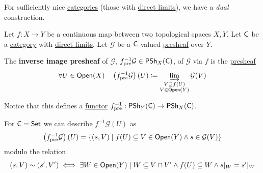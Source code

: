 \documentclass[../../../main]{subfiles}
\begin{document}
For sufficiently nice \hyperref[def:category]{categories} (those with \hyperref[def:direct-limit]{direct limits}), we have a \textit{dual} construction.
\begin{definition} \label{def:inverse-image-presheaf}
  Let \(f: X \to Y\) be a continuous map between two topological spaces \(X, Y\).
  Let \(\mathsf{C}\) be a \hyperref[def:category]{category} with \hyperref[def:direct-limit]{direct limits}.
  Let \(\mathcal{G}\) be a \(\mathsf{C}\)-valued \hyperref[def:presheaf]{presheaf} over \(Y\).

  The \textbf{inverse image presheaf} of \(\mathcal{G}\), \(f_{\operatorname{pre}}^{-1}\mathcal{G} \in \mathsf{PSh}_{X}(\mathsf{C})\), of \(\mathcal{G}\) via \(f\) is the \hyperref[def:presheaf]{presheaf}
  \begin{equation*}
    \forall U \in \mathsf{Open}(X) \quad \left( f_{\operatorname{pre}}^{-1}\mathcal{G} \right)(U) \coloneq \varinjlim_{\substack{V \supseteq f(U) \\ V \in \mathsf{Open}(Y) }} \mathcal{G}(V)
  \end{equation*}

  Notice that this defines a \hyperref[def:functor]{functor} \(f_{\operatorname{pre}}^{-1}: \mathsf{PSh}_{Y}(\mathsf{C}) \to \mathsf{PSh}_{X}(\mathsf{C})\).
\end{definition}

\begin{remark} \label{remark:inverse-image-presheaf-set}
  For \(\mathsf{C} = \mathsf{Set}\) we can describe \(f^{-1}\mathcal{G}(U)\) as
  \begin{equation*}
    \left( f_{\operatorname{pre}}^{-1} \mathcal{G} \right)(U) = \{ (s, V) \mid f(U) \subseteq V \in \mathsf{Open}(Y) \land s \in \mathcal{G}(V) \}
  \end{equation*}
  modulo the relation
  \begin{equation*}
    (s, V) \sim (s', V') \iff \exists W \in \mathsf{Open}(Y) \mid W \subseteq V \cap V' \land f(U) \subseteq W \land s|_{W} = s'|_{W}
  \end{equation*}
\end{remark}
\end{document}

